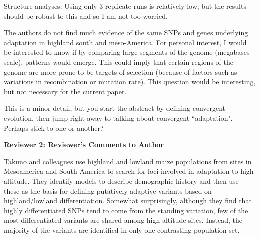 \documentclass[onecolumn,oneside,letterpaper]{article}
\begin{document}
Structure analyses:  Using only 3 replicate runs is relatively low, but the results should be robust to this and so I am not too worried.  

The authors do not find much evidence of the same SNPs and genes underlying adaptation in highland south and meso-America. For personal interest, I would be interested to know if by comparing large segments of the genome (megabases scale), patterns would emerge.  This could imply that certain regions of the genome are more prone to be targets of selection  (because of factors such as variations in recombination or mutation rate). This question would be interesting, but not necessary for the current paper.    

This is a minor detail, but you start the abstract by defining convergent evolution, then jump right away to talking about convergent ``adaptation".  Perhaps stick to one or another? 


\textbf{Reviewer 2: Reviewer's Comments to Author}

Takuno and colleagues use highland and lowland maize populations from sites in Mesoamerica and South America to search for loci involved in adaptation to high altitude.  They identify models to describe demographic history and then use these as the basis for defining putatively adaptive variants based on highland/lowland differentiation.  Somewhat surprisingly, although they find that highly differentiated SNPs tend to come from the standing variation, few of the most differentiated variants are shared among high altitude sites. Instead, the majority of the variants are identified in only one contrasting population set.   
\end{document}
